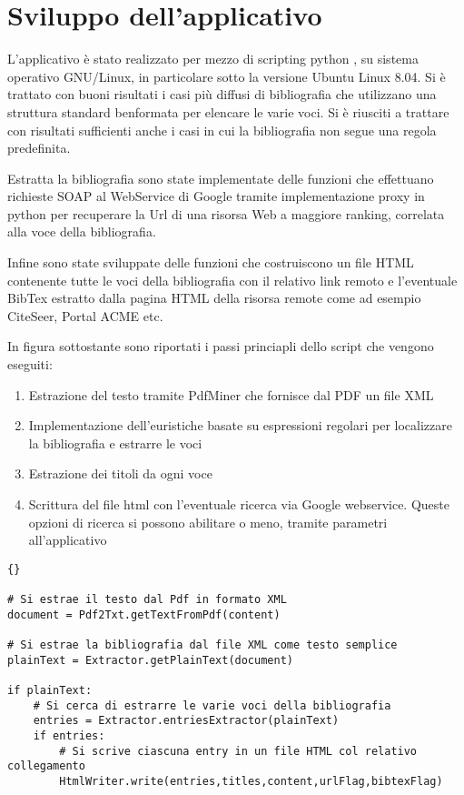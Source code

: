 \section{Sviluppo dell'applicativo} \label{software}

L'applicativo è stato realizzato per mezzo di scripting python \cite{pydoc}, su sistema operativo GNU/Linux, in particolare sotto la versione Ubuntu Linux 8.04. Si è trattato con buoni risultati i casi più diffusi di bibliografia che utilizzano una struttura standard benformata per elencare le varie voci. Si è riusciti a trattare con risultati sufficienti anche i casi in cui la bibliografia non segue una regola predefinita.

Estratta la bibliografia sono state implementate delle funzioni che effettuano richieste SOAP al WebService di Google \cite{GWS} tramite implementazione proxy in python \cite{ibm-py-ws} per recuperare la Url di una risorsa Web a maggiore ranking, correlata alla voce della bibliografia. 

Infine sono state sviluppate delle funzioni che costruiscono un file HTML contenente tutte le voci della bibliografia con il relativo link remoto e l'eventuale BibTex estratto dalla pagina HTML della risorsa remote come ad esempio CiteSeer, Portal ACME etc.

In figura sottostante sono riportati i passi princiapli dello script che vengono eseguiti:
\begin{enumerate}
	\item Estrazione del testo tramite PdfMiner che fornisce dal PDF un file XML
	\item Implementazione dell'euristiche basate su espressioni regolari per localizzare la bibliografia e estrarre le voci
	\item Estrazione dei titoli da ogni voce
	\item Scrittura del file html con l'eventuale ricerca via  Google webservice. Queste opzioni di ricerca si possono abilitare o meno, tramite parametri all'applicativo
\end{enumerate}


\begin{lstlisting}[frame=r,caption=Il File principale - pdftoref.py ,breaklines=true,basicstyle=\small]{}

# Si estrae il testo dal Pdf in formato XML
document = Pdf2Txt.getTextFromPdf(content)

# Si estrae la bibliografia dal file XML come testo semplice
plainText = Extractor.getPlainText(document)

if plainText:
	# Si cerca di estrarre le varie voci della bibliografia 
	entries = Extractor.entriesExtractor(plainText)
	if entries:
		# Si scrive ciascuna entry in un file HTML col relativo collegamento
		HtmlWriter.write(entries,titles,content,urlFlag,bibtexFlag)

\end{lstlisting}

